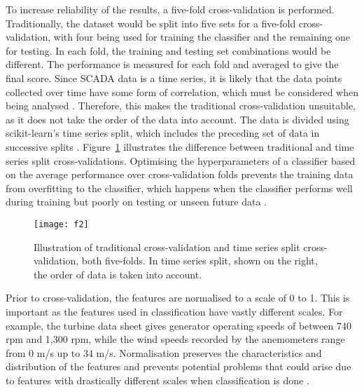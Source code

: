 To increase reliability of the results, a five-fold cross-validation is performed. Traditionally, the dataset would be split into five sets for a five-fold cross-validation, with four being used for training the classifier and the remaining one for testing. In each fold, the training and testing set combinations would be different. The performance is measured for each fold and averaged to give the final score. Since SCADA data is a time series, it is likely that the data points collected over time have some form of correlation, which must be considered when being analysed \cite{64I}. Therefore, this makes the traditional cross-validation unsuitable, as it does not take the order of the data into account. The data is divided using scikit-learn's time series split, which includes the preceding set of data in successive splits \cite{31C}. Figure~\ref{f2} illustrates the difference between traditional and time series split cross-validations. Optimising the hyperparameters of a classifier based on the average performance over cross-validation folds prevents the training data from overfitting to the classifier, which happens when the classifier performs well during training but poorly on testing or unseen future data \cite{Puget16,Liang16}.

\begin{figure}
    \centering
    \texttt{[image: f2]}
    \caption{\label{f2}Illustration of traditional cross-validation and time series split cross-validation, both five-folds. In time series split, shown on the right, the order of data is taken into account.}
\end{figure}

Prior to cross-validation, the features are normalised \cite{43P} to a scale of 0 to 1. This is important as the features used in classification have vastly different scales. For example, the turbine data sheet gives generator operating speeds of between 740 rpm and 1,300 rpm, while the wind speeds recorded by the anemometers range from 0 m/s up to 34 m/s. Normalisation preserves the characteristics and distribution of the features and prevents potential problems that could arise due to features with drastically different scales when classification is done \cite{Norma17}.

